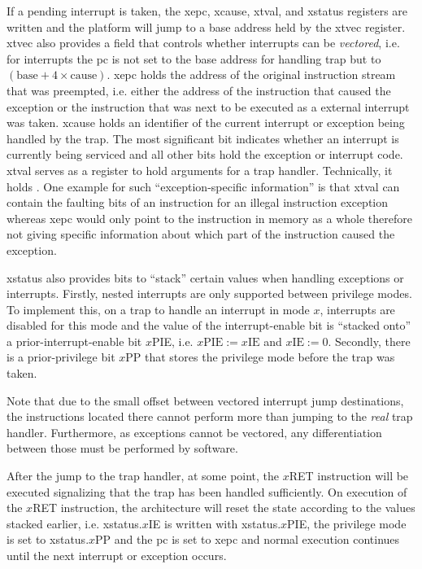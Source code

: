 If a pending interrupt is taken, the \gls{xepc}, \gls{xcause}, \gls{xtval}, and \gls{xstatus} registers are written and the platform will jump to a base address held by the \gls{xtvec} register.
\gls{xtvec} also provides a field that controls whether interrupts can be \textit{vectored}, i.e. for interrupts the \gls{pc} is not set to the base address for handling trap but to $ (\text{base} + 4 \times \text{cause}) $.
\gls{xepc} holds the address of the original instruction stream that was preempted, i.e. either the address of the instruction that caused the exception or the instruction that was next to be executed as a external interrupt was taken.
\gls{xcause} holds an identifier of the current interrupt or exception being handled by the trap.
The most significant bit indicates whether an interrupt is currently being serviced and all other bits hold the exception or interrupt code.
\gls{xtval} serves as a register to hold arguments for a trap handler.
Technically, it holds .
One example for such \enquote{exception-specific information} is that \gls{xtval} can contain the faulting bits of an instruction for an illegal instruction exception whereas \gls{xepc} would only point to the instruction in memory as a whole therefore not giving specific information about which part of the instruction caused the exception.

\gls{xstatus} also provides bits to \enquote{stack} certain values when handling exceptions or interrupts.
Firstly, nested interrupts are only supported between privilege modes.
To implement this, on a trap to handle an interrupt in mode $ x $, interrupts are disabled for this mode and the value of the interrupt-enable bit is \enquote{stacked onto} a prior-interrupt-enable bit $x$PIE, i.e. $ x\text{PIE} := x\text{IE} $ and $ x\text{IE} := 0 $.
Secondly, there is a prior-privilege bit $x$PP that stores the privilege mode before the trap was taken.

Note that due to the small offset between vectored interrupt jump destinations, the instructions located there cannot perform more than jumping to the \textit{real} trap handler.
Furthermore, as exceptions cannot be vectored, any differentiation between those must be performed by software.

After the jump to the trap handler, at some point, the $x$RET instruction will be executed signalizing that the trap has been handled sufficiently.
On execution of the $x$RET instruction, the architecture will reset the state according to the values stacked earlier, i.e. \gls{xstatus}.$x$IE is written with \gls{xstatus}.$x$PIE, the privilege mode is set to \gls{xstatus}.$x$PP and the \gls{pc} is set to \gls{xepc} and normal execution continues until the next interrupt or exception occurs.

